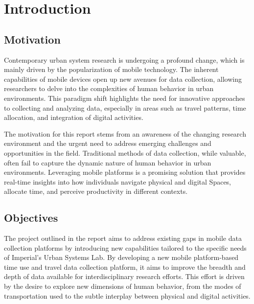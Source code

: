 \documentclass[12pt,two side]{report}
\date{June 2024}
\begin{document}



\clearpage{\pagestyle{empty}\cleardoublepage}
\setcounter{page}{1}
\pagestyle{fancy}
\tableofcontents 

\setcounter{page}{1}
\fancyhead[LE,RO]{\slshape \rightmark}
\fancyhead[LO,RE]{\slshape \leftmark}

\chapter{Introduction}
\section{Motivation}
Contemporary urban system research is undergoing a profound change, which is mainly driven by the popularization of mobile technology. The inherent capabilities of mobile devices open up new avenues for data collection, allowing researchers to delve into the complexities of human behavior in urban environments. This paradigm shift highlights the need for innovative approaches to collecting and analyzing data, especially in areas such as travel patterns, time allocation, and integration of digital activities\cite{alho2022online}.\newline

The motivation for this report stems from an awareness of the changing research environment and the urgent need to address emerging challenges and opportunities in the field. Traditional methods of data collection, while valuable, often fail to capture the dynamic nature of human behavior in urban environments\cite{mccool2021app}. Leveraging mobile platforms is a promising solution that provides real-time insights into how individuals navigate physical and digital Spaces, allocate time, and perceive productivity in different contexts.
\section{Objectives}
The project outlined in the report aims to address existing gaps in mobile data collection platforms by introducing new capabilities tailored to the specific needs of Imperial's Urban Systems Lab. By developing a new mobile platform-based time use and travel data collection platform, it aims to improve the breadth and depth of data available for interdisciplinary research efforts. This effort is driven by the desire to explore new dimensions of human behavior, from the modes of transportation used to the subtle interplay between physical and digital activities.\newline
\end{document}
